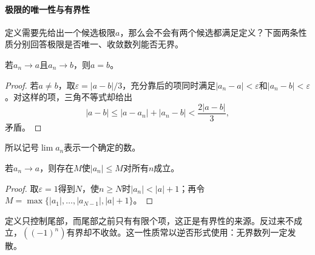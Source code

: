 \paragraph{极限的唯一性与有界性}
定义需要先给出一个候选极限$a$，那么会不会有两个候选都满足定义？下面两条性质分别回答极限是否唯一、收敛数列能否无界。
\begin{theorem}[极限的唯一性]
\label{thm:ru-limit-uniqueness}
若$a_n\to a$且$a_n\to b$，则$a=b$。
\end{theorem}
\begin{proof}
若$a\neq b$，取$\varepsilon=|a-b|/3$，充分靠后的项同时满足$|a_n-a|<\varepsilon$和$|a_n-b|<\varepsilon$。对这样的项，三角不等式却给出
\[
 |a-b|\leq|a-a_n|+|a_n-b|<\frac{2|a-b|}3,
\]
矛盾。
\end{proof}
所以记号$\lim a_n$表示一个确定的数。

\begin{theorem}[收敛数列的有界性]
\label{thm:ru-convergent-bounded}
若$a_n\to a$，则存在$M$使$|a_n|\leq M$对所有$n$成立。
\end{theorem}
\begin{proof}
取$\varepsilon=1$得到$N$，使$n\geq N$时$|a_n|<|a|+1$；再令$M=\max\{|a_1|,\ldots,|a_{N-1}|,|a|+1\}$。
\end{proof}
定义只控制尾部，而尾部之前只有有限个项，这正是有界性的来源。反过来不成立，$((-1)^n)$有界却不收敛。这一性质常以逆否形式使用：无界数列一定发散。

